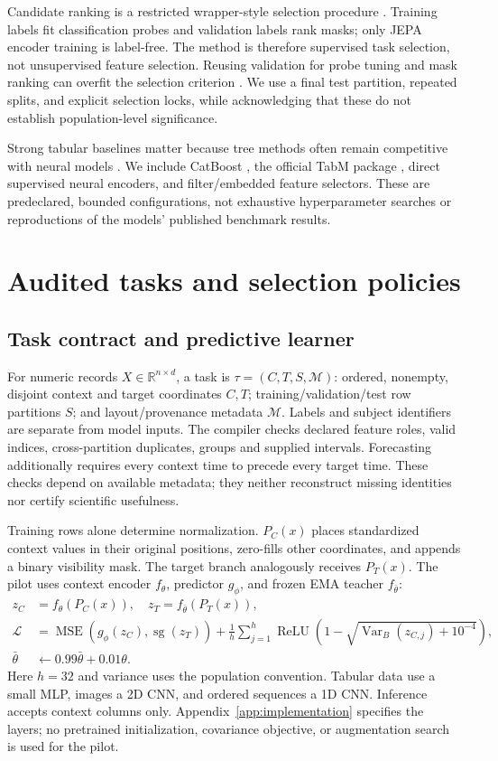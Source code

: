 \documentclass{article}
\newcommand{\sg}{\operatorname{sg}}
\newcommand{\relu}{\operatorname{ReLU}}
\begin{document}
Candidate ranking is a restricted wrapper-style selection procedure \citep{guyon2003selection}. Training labels fit classification probes and validation labels rank masks; only JEPA encoder training is label-free. The method is therefore supervised task selection, not unsupervised feature selection. Reusing validation for probe tuning and mask ranking can overfit the selection criterion \citep{cawley2010overfitting}. We use a final test partition, repeated splits, and explicit selection locks, while acknowledging that these do not establish population-level significance.

Strong tabular baselines matter because tree methods often remain competitive with neural models \citep{grinsztajn2022trees}. We include CatBoost \citep{prokhorenkova2018catboost}, the official TabM package \citep{gorishniy2025tabm}, direct supervised neural encoders, and filter/embedded feature selectors. These are predeclared, bounded configurations, not exhaustive hyperparameter searches or reproductions of the models' published benchmark results.

\section{Audited tasks and selection policies}
\subsection{Task contract and predictive learner}
For numeric records $X\in\mathbb{R}^{n\times d}$, a task is $\tau=(C,T,S,\mathcal M)$: ordered, nonempty, disjoint context and target coordinates $C,T$; training/validation/test row partitions $S$; and layout/provenance metadata $\mathcal M$. Labels and subject identifiers are separate from model inputs. The compiler checks declared feature roles, valid indices, cross-partition duplicates, groups and supplied intervals. Forecasting additionally requires every context time to precede every target time. These checks depend on available metadata; they neither reconstruct missing identities nor certify scientific usefulness.

Training rows alone determine normalization. $P_C(x)$ places standardized context values in their original positions, zero-fills other coordinates, and appends a binary visibility mask. The target branch analogously receives $P_T(x)$. The pilot uses context encoder $f_\theta$, predictor $g_\phi$, and frozen EMA teacher $f_{\bar\theta}$:
\begin{align}
 z_C&=f_\theta(P_C(x)),\quad z_T=f_{\bar\theta}(P_T(x)),\\
 \mathcal L&=\operatorname{MSE}(g_\phi(z_C),\sg(z_T))+
 \frac{1}{h}\sum_{j=1}^{h}\relu\!\left(1-\sqrt{\operatorname{Var}_B(z_{C,j})+10^{-4}}\right),\label{eq:loss}\\
 \bar\theta&\leftarrow0.99\bar\theta+0.01\theta.
\end{align}
Here $h=32$ and variance uses the population convention. Tabular data use a small MLP, images a 2D CNN, and ordered sequences a 1D CNN. Inference accepts context columns only. Appendix~\ref{app:implementation} specifies the layers; no pretrained initialization, covariance objective, or augmentation search is used for the pilot.
\end{document}
